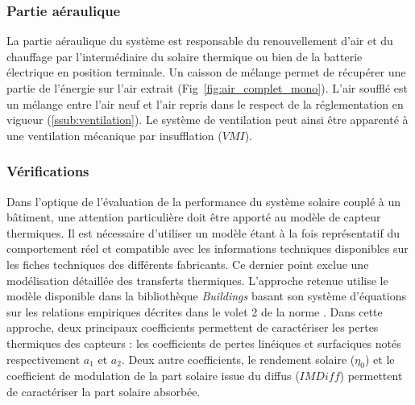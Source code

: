 \subsubsection{Partie aéraulique} %
\label{ssub:partie_aéraulique}
La partie aéraulique du système est responsable du renouvellement d’air et du chauffage
par l’intermédiaire du solaire thermique ou bien de la batterie électrique en
position terminale. Un caisson de mélange permet de récupérer une partie de l’énergie
sur l’air extrait (Fig~\ref{fig:air_complet_mono}). L’air soufflé est un mélange entre
l’air neuf et l’air repris dans le respect de la réglementation en vigueur (\ref{ssub:ventilation}).
Le système de ventilation peut ainsi être apparenté à une ventilation mécanique par insufflation
($VMI$).


\subsubsection{Vérifications} %
\label{ssub:verifications}
Dans l’optique de l’évaluation de la performance  du système solaire couplé à un bâtiment, une
attention particulière doit être apporté au modèle de capteur thermiques. Il est
nécessaire d’utiliser un modèle étant à la fois représentatif du comportement réel
et compatible avec les informations techniques disponibles sur les fiches techniques
des différents fabricants. Ce dernier point exclue une modélisation détaillée
des transferts thermiques. L’approche retenue utilise le modèle disponible dans la
bibliothèque \emph{Buildings} basant son système d’équations sur les relations
empiriques décrites dans le volet 2 de la norme \textcite{EN129752}.
Dans cette approche, deux principaux coefficients
permettent de caractériser les pertes thermiques des capteurs : les coefficients de pertes linéiques
et surfaciques notés respectivement $a_{1}$ et $a_{2}$. Deux autre coefficients, le rendement solaire ($\eta_{0}$)
et le coefficient de modulation de la part solaire issue du diffus ($IMDiff$)
permettent de caractériser la part solaire absorbée.

